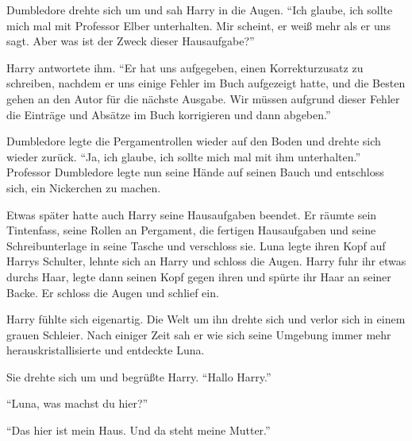 Dumbledore drehte sich um und sah Harry in die Augen. \enquote{Ich glaube, ich sollte mich mal mit Professor Elber unterhalten. Mir scheint, er weiß mehr als er uns sagt. Aber was ist der Zweck dieser Hausaufgabe?}

Harry antwortete ihm. \enquote{Er hat uns aufgegeben, einen Korrekturzusatz zu schreiben, nachdem er uns einige Fehler im Buch aufgezeigt hatte, und die Besten gehen an den Autor für die nächste Ausgabe. Wir müssen aufgrund dieser Fehler die Einträge und Absätze im Buch korrigieren und dann abgeben.}

Dumbledore legte die Pergamentrollen wieder auf den Boden und drehte sich wieder zurück. \enquote{Ja, ich glaube, ich sollte mich mal mit ihm unterhalten.} Professor Dumbledore legte nun seine Hände auf seinen Bauch und entschloss sich, ein Nickerchen zu machen.

Etwas später hatte auch Harry seine Hausaufgaben beendet. Er räumte sein Tintenfass, seine Rollen an Pergament, die fertigen Hausaufgaben und seine Schreibunterlage in seine Tasche und verschloss sie. Luna legte ihren Kopf auf Harrys Schulter, lehnte sich an Harry und schloss die Augen. Harry fuhr ihr etwas durchs Haar, legte dann seinen Kopf gegen ihren und spürte ihr Haar an seiner Backe. Er schloss die Augen und schlief ein.

Harry fühlte sich eigenartig. Die Welt um ihn drehte sich und verlor sich in einem grauen Schleier. Nach einiger Zeit sah er wie sich seine Umgebung immer mehr herauskristallisierte und entdeckte Luna.

Sie drehte sich um und begrüßte Harry. \enquote{Hallo Harry.}

\enquote{Luna, was machst du hier?}

\enquote{Das hier ist mein Haus. Und da steht meine Mutter.}

